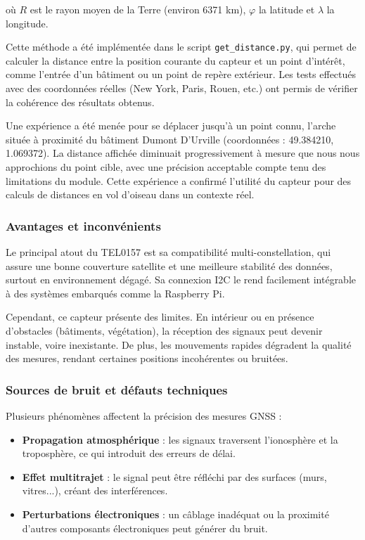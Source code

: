 où $R$ est le rayon moyen de la Terre (environ 6371 km), $\varphi$ la latitude et $\lambda$ la longitude.

Cette méthode a été implémentée dans le script \texttt{get\_distance.py}, qui permet de calculer la distance entre la position courante du capteur et un point d’intérêt, comme l’entrée d’un bâtiment ou un point de repère extérieur. Les tests effectués avec des coordonnées réelles (New York, Paris, Rouen, etc.) ont permis de vérifier la cohérence des résultats obtenus.

Une expérience a été menée pour se déplacer jusqu’à un point connu, l’arche située à proximité du bâtiment Dumont D’Urville (coordonnées : 49.384210, 1.069372). La distance affichée diminuait progressivement à mesure que nous nous approchions du point cible, avec une précision acceptable compte tenu des limitations du module. Cette expérience a confirmé l’utilité du capteur pour des calculs de distances en vol d’oiseau dans un contexte réel.


\vspace{1em}
\subsubsection*{Avantages et inconvénients}

Le principal atout du TEL0157 est sa compatibilité multi-constellation, qui assure une bonne couverture satellite et une meilleure stabilité des données, surtout en environnement dégagé. Sa connexion I2C le rend facilement intégrable à des systèmes embarqués comme la Raspberry Pi.

Cependant, ce capteur présente des limites. En intérieur ou en présence d'obstacles (bâtiments, végétation), la réception des signaux peut devenir instable, voire inexistante. De plus, les mouvements rapides dégradent la qualité des mesures, rendant certaines positions incohérentes ou bruitées.

\vspace{1em}
\subsubsection*{Sources de bruit et défauts techniques}

Plusieurs phénomènes affectent la précision des mesures GNSS :

\begin{itemize}
    \item \textbf{Propagation atmosphérique} : les signaux traversent l’ionosphère et la troposphère, ce qui introduit des erreurs de délai.
    \item \textbf{Effet multitrajet} : le signal peut être réfléchi par des surfaces (murs, vitres...), créant des interférences.
    \item \textbf{Perturbations électroniques} : un câblage inadéquat ou la proximité d’autres composants électroniques peut générer du bruit.
\end{itemize}


